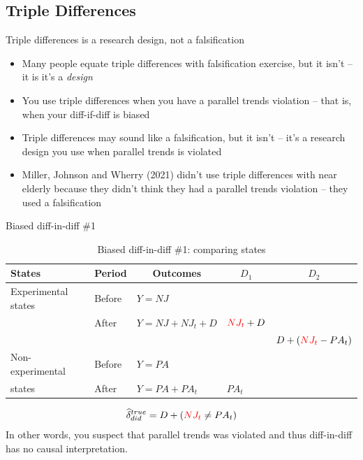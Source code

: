 \documentclass{beamer}
\begin{document}
\subsection{Triple Differences}

\begin{frame}{Triple differences is a research design, not a falsification}

\begin{itemize}

\item Many people equate triple differences with falsification exercise, but it isn't -- it is it's a \emph{design}
\item You use triple differences when you have a parallel trends violation -- that is, when your diff-if-diff is biased
\item Triple differences may sound like a falsification, but it isn't -- it's a research design you use when parallel trends is violated
\item Miller, Johnson and Wherry (2021) didn't use triple differences with near elderly because they didn't think they had a parallel trends violation -- they used a falsification
\end{itemize}

\end{frame}




\begin{frame}{Biased diff-in-diff \#1}

\begin{table}\centering
\scriptsize
		\caption{Biased diff-in-diff \#1: comparing states}
		\begin{center}
		\begin{tabular}{lll|lc}
		\toprule
		\multicolumn{1}{l}{\textbf{States}}&
		\multicolumn{1}{c}{\textbf{Period}}&
		\multicolumn{1}{c}{\textbf{Outcomes}}&
		\multicolumn{1}{c}{$D_1$}&
		\multicolumn{1}{c}{$D_2$}\\
		\midrule
		Experimental states & Before & $Y=NJ$ \\
		& After & $Y=NJ + NJ_t + D$ & $\textcolor{red}{NJ_t}+D$\\
		\midrule
		& & & & $D + (\textcolor{red}{NJ_t}- PA_t)$ \\
		\midrule
		Non-experimental  & Before & $Y=PA$ \\
		states& After & $Y=PA + PA_t$ & $PA_t$\\
		\bottomrule
		\end{tabular}
		\end{center}
	\end{table}

\begin{eqnarray*}
\widehat{\delta}^{true}_{did} = D + (\textcolor{red}{NJ_t} \neq PA_t)
\end{eqnarray*}In other words, you suspect that parallel trends was violated and thus diff-in-diff has no causal interpretation.

\end{frame}
\end{document}
